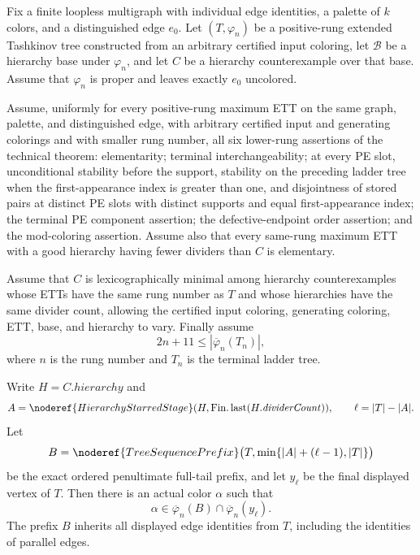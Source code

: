 \begin{lemma}
Fix a finite loopless multigraph with individual edge identities, a
palette of $k$ colors, and a distinguished edge $e_0$.  Let
$(T,\varphi_n)$ be a positive-rung extended Tashkinov tree constructed
from an arbitrary certified input coloring, let $\mathcal B$ be a
hierarchy base under $\varphi_n$, and let $C$ be a hierarchy
counterexample over that base.  Assume that $\varphi_n$ is proper and
leaves exactly $e_0$ uncolored.

Assume, uniformly for every positive-rung maximum ETT on the same graph,
palette, and distinguished edge, with arbitrary certified input and
generating colorings and with smaller rung number, all six lower-rung
assertions of the technical theorem: elementarity; terminal
interchangeability; at every PE slot, unconditional stability before the
support, stability on the preceding ladder tree when the first-appearance
index is greater than one, and disjointness of stored pairs at distinct PE
slots with distinct supports and equal first-appearance index; the terminal
PE component assertion; the defective-endpoint order assertion; and the
mod-coloring assertion.  Assume also that every
same-rung maximum ETT with a good hierarchy having fewer dividers than
$C$ is elementary.

Assume that $C$ is lexicographically minimal among hierarchy
counterexamples whose ETTs have the same rung number as $T$ and whose
hierarchies have the same divider count, allowing the certified input
coloring, generating coloring, ETT, base, and hierarchy to vary.  Finally
assume
\[
 2n+11\leq |\overline\varphi_n(T_n)|,
\]
where $n$ is the rung number and $T_n$ is the terminal ladder tree.

Write $H=C.\mathit{hierarchy}$ and
\[
 A=\noderef{HierarchyStarredStage}
      (H,\operatorname{Fin.last}(H.\mathit{dividerCount})),
 \qquad \ell=|T|-|A|.
\]
Let
\[
 B=\noderef{TreeSequencePrefix}
       \bigl(T,\min\{|A|+(\ell-1),|T|\}\bigr)
\]
be the exact ordered penultimate full-tail prefix, and let $y_\ell$ be
the final displayed vertex of $T$.  Then there is an actual color
$\alpha$ such that
\[
 \alpha\in\overline\varphi_n(B)
       \cap\overline\varphi_n(y_\ell).                         \tag{7.1}
\]
The prefix $B$ inherits all displayed edge identities from $T$, including
the identities of parallel edges.
\end{lemma}
